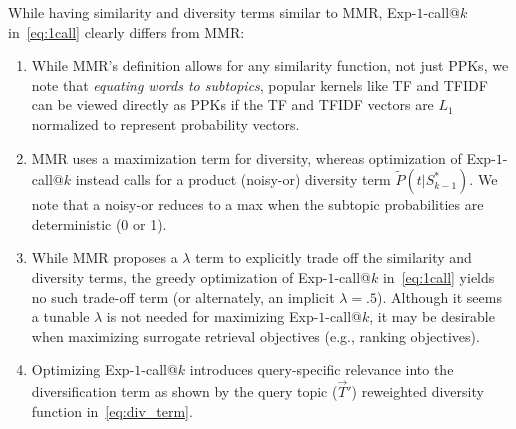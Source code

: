 While having similarity and diversity terms similar to MMR,
Exp-$1$-call@$k$ in~\eqref{eq:1call} clearly differs from MMR:
\begin{enumerate}
\item While MMR's definition allows for any similarity function, not
just PPKs, we note that \emph{equating words to subtopics}, popular
kernels like TF and TFIDF~\cite{salton83Introduction} can be viewed
directly as PPKs if the TF and TFIDF vectors are $L_1$ normalized to
represent probability vectors.
\item MMR uses a maximization term for
diversity, whereas optimization of Exp-$1$-call@$k$ instead calls for
a product (noisy-or) diversity term $\tilde{P}(t | S_{k-1}^*)$.
We note that a noisy-or reduces to a max when the subtopic
probabilities are deterministic (0 or 1).
\item While MMR proposes a $\lambda$ term to explicitly
trade off the similarity and diversity terms, the greedy optimization
of Exp-$1$-call@$k$ in~\eqref{eq:1call} yields no such trade-off term
(or alternately, an implicit $\lambda=.5$).  Although it seems a tunable
$\lambda$ is not needed for maximizing Exp-$1$-call@$k$, it may be
desirable when maximizing surrogate retrieval objectives (e.g., ranking
objectives).
\item Optimizing Exp-$1$-call@$k$ introduces query-specific relevance into
the diversification term as shown
by the query topic ($\vec{T}'$) reweighted
diversity function in~\eqref{eq:div_term}.
\end{enumerate}

